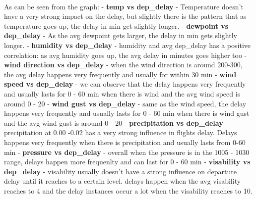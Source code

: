 \documentclass[11pt]{article}
\begin{document}
    \begin{center}
    \end{center}
    { \hspace*{\fill} \\}
    
    As can be seen from the graph: - \textbf{temp vs dep\_delay} -
Temperature doesn't have a very strong impact on the delay, but slightly
there is the pattern that as temperature goes up, the delay in min get
slightly longer. - \textbf{dewpoint vs dep\_delay} - As the avg dewpoint
gets larger, the delay in min gets slightly longer. - \textbf{humidity
vs dep\_delay} - humidity and avg dep\_delay has a positive correlation:
as avg humidity goes up, the avg delay in minutes goes higher too -
\textbf{wind direction vs dep\_delay} - when the wind direction is
around 200-300, the avg delay happens very frequently and usually for
within 30 min - \textbf{wind speed vs dep\_delay} - we can observe that
the delay happens very frequently and usually lasts for 0 - 60 min when
there is wind and the avg wind speed is around 0 - 20 - \textbf{wind
gust vs dep\_delay} - same as the wind speed, the delay happens very
frequently and usually lasts for 0 - 60 min when there is wind gust and
the avg wind gust is around 0 - 20 - \textbf{precipitation vs
dep\_delay} - precipitation at 0.00 -0.02 has a very strong influence in
flights delay. Delays happens very frequently when there is
precipitation and usually lasts from 0-60 min - \textbf{pressure vs
dep\_delay} - overall when the pressure is in the 1005 - 1030 range,
delays happen more frequenlty and can last for 0 - 60 min -
\textbf{visability vs dep\_delay} - visability usually doesn't have a
strong influence on departure delay until it reaches to a certain level.
delays happen when the avg visability reaches to 4 and the delay
instances occur a lot when the visability reaches to 10.


    
    
    
    
\end{document}
